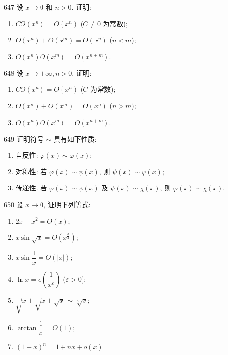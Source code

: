 \begin{prob}[L]{647}
设 $x \to 0$ 和 $n > 0$. 证明:
\begin{enumerate}[label=(\alph*), itemsep=2pt, topsep=3pt]
  \item $C O(x^n) = O(x^n)$ ($C \neq 0$ 为常数);
  \item $O(x^n) + O(x^m) = O(x^n)$ ($n < m$);
  \item $O(x^n) O(x^m) = O(x^{n+m})$.
\end{enumerate}
\end{prob}

\begin{prob}[L]{648}
设 $x \to +\infty, n > 0$. 证明:
\begin{enumerate}[label=(\alph*), itemsep=2pt, topsep=3pt]
  \item $C O(x^n) = O(x^n)$ ($C$ 为常数);
  \item $O(x^n) + O(x^m) = O(x^n)$ ($n > m$);
  \item $O(x^n) O(x^m) = O(x^{n+m})$.
\end{enumerate}
\end{prob}

\begin{prob}[L]{649}
证明符号 $\sim$ 具有如下性质:
\begin{enumerate}[label=(\arabic*), itemsep=2pt, topsep=3pt]
  \item 自反性: $\varphi(x) \sim \varphi(x)$;
  \item 对称性: 若 $\varphi(x) \sim \psi(x)$, 则 $\psi(x) \sim \varphi(x)$;
  \item 传递性: 若 $\varphi(x) \sim \psi(x)$ 及 $\psi(x) \sim \chi(x)$, 则 $\varphi(x) \sim \chi(x)$.
\end{enumerate}
\end{prob}

\begin{prob}[L]{650}
设 $x \to 0$, 证明下列等式:
\begin{enumerate}[label=(\alph*), itemsep=2pt, topsep=3pt]
  \item $2x - x^2 = O(x)$;
  \item $x\sin\sqrt{x} = O(x^{\frac{3}{2}})$;
  \item $x\sin\dfrac{1}{x} = O(|x|)$;
  \item $\ln x = o\left(\dfrac{1}{x^\varepsilon}\right)$ ($\varepsilon > 0$);
  \item $\sqrt{x + \sqrt{x + \sqrt{x}}} \sim \sqrt[8]{x}$;
  \item $\arctan\dfrac{1}{x} = O(1)$;
  \item $(1 + x)^n = 1 + nx + o(x)$.
\end{enumerate}
\end{prob}

